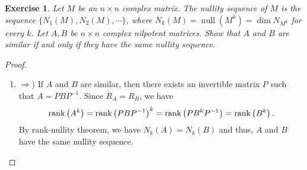 \documentclass[11pt]{article}
\newtheorem{exercise}{Exercise}[section]
\theoremstyle{definition}
\numberwithin{equation}{subsection}
\begin{document}
\begin{exercise}
Let $M$ be an $n \times n$ complex matrix. The nullity sequence of $M$ is the sequence $\{N_1(M), N_2(M), \cdots\}$, where $N_k(M) = \operatorname{null} (M^k) = \dim N_{M^k}$ for every $k$. Let $A, B$ be $n \times n$ complex nilpotent matrices. Show that $A$ and $B$ are similar if and only if they have the same nullity sequence.
\end{exercise}
\begin{proof}
~\begin{enumerate}[label=(\alph*)]
    \item $\Rightarrow$) If $A$ and $B$ are similar, then there exists an invertible matrix $P$ such that $A = PBP^{-1}$. Since $R_A = R_B$, we have
    \begin{align*}
        \rank \left(A^k\right) = \rank \left(PBP^{-1}\right)^k = \rank \left(PB^kP^{-1}\right) = \rank \left(B^k\right).
    \end{align*}
    By rank-nullity theorem, we have $N_k(A) = N_k(B)$ and thus, $A$ and $B$ have the same nullity sequence.
    

\end{enumerate}
\end{proof}
\end{document}
